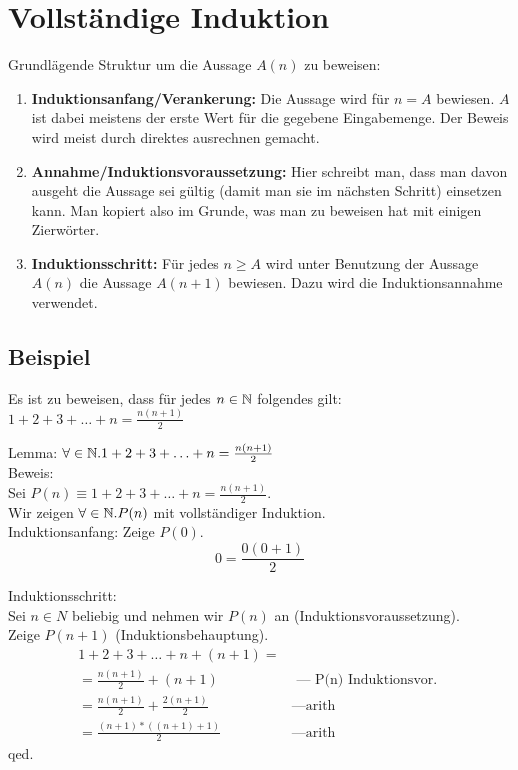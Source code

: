 \section{Vollständige Induktion}
Grundlägende Struktur um die Aussage $A(n)$ zu beweisen:
\begin{enumerate}
	\item \textbf{Induktionsanfang/Verankerung:} Die Aussage wird für $n = A$ bewiesen.
	$A$ ist dabei meistens der erste Wert für die gegebene Eingabemenge.
	Der Beweis wird meist durch direktes ausrechnen gemacht.
	\item \textbf{Annahme/Induktionsvoraussetzung:} Hier schreibt man,
	dass man davon ausgeht die Aussage sei gültig (damit man sie im nächsten Schritt)
	einsetzen kann. Man kopiert also im Grunde, was man zu beweisen hat mit einigen Zierwörter.
	\item \textbf{Induktionsschritt:} Für jedes $n \geq A$ wird unter Benutzung der Aussage $A(n)$
	die Aussage $A(n+1)$ bewiesen. Dazu wird die Induktionsannahme verwendet.
\end{enumerate}

\subsection{Beispiel}
		Es ist zu beweisen, dass für jedes $n \in \mathbb{N}$ folgendes gilt: $1 + 2 + 3 + \ldots + n = \frac{n(n + 1)}{2}$		
		
		Lemma: $\forall \in \mathbb{N}. 1 + 2 + 3 + \ldots + n = \frac{n(n + 1)}{2}$ \\
		
	Beweis: \\
		  Sei $P(n) \equiv 1 + 2 + 3 + \ldots + n = \frac{n(n + 1)}{2}$. \\
		  Wir zeigen $\forall \in \mathbb{N}. P(n)$ mit vollständiger Induktion.\\
		
		Induktionsanfang: Zeige $P(0)$. \\
		 $$0 =  \frac{0(0 + 1)}{2}$$
		
		  Induktionsschritt: \\
		    Sei $n \in N$ beliebig und nehmen wir $P(n)$ an (Induktionsvoraussetzung).  \\
		    Zeige $P(n+1)$ (Induktionsbehauptung).\\
		  \begin{align}
		      1 + 2 + 3 + \ldots + n + (n + 1) =\\
		      = \frac{n(n + 1)}{2} + (n+1)       & \text{ — P(n) Induktionsvor. }\\
		      = \frac{n(n + 1)}{2} + \frac{2(n + 1)}{2}  & \text{—arith}\\
		      = \frac{(n+1)*((n+1)+1)}{2}        & \text{—arith}
		\end{align}
		qed.